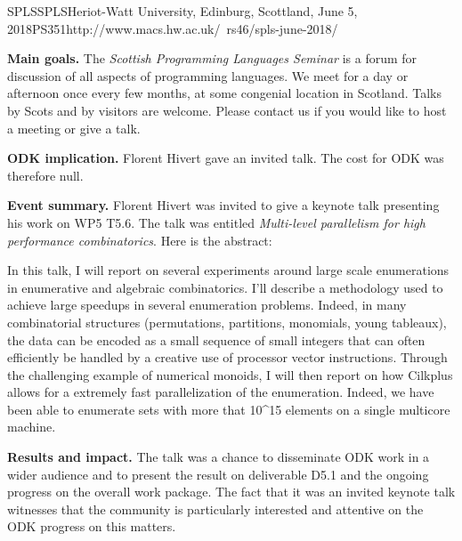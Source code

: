 \begin{event}{SPLS}{SPLS}{Heriot-Watt University, Edinburg, Scottland, June 5, 2018}{PS}{35}{1}{http://www.macs.hw.ac.uk/~rs46/spls-june-2018/}

\textbf{Main goals.}  The \emph{Scottish Programming Languages Seminar} is a
forum for discussion of all aspects of programming languages. We meet for a
day or afternoon once every few months, at some congenial location in
Scotland. Talks by Scots and by visitors are welcome. Please contact us if
you would like to host a meeting or give a talk.

\textbf{ODK implication.} Florent Hivert gave an invited talk. The cost for
ODK was therefore null.

\textbf{Event summary.}  Florent Hivert was invited to give a keynote talk
presenting his work on WP5 T5.6. The talk was entitled \emph{ Multi-level
  parallelism for high performance combinatorics}. Here is the abstract:

In this talk, I will report on several experiments around large scale
enumerations in enumerative and algebraic combinatorics.  I'll describe a
methodology used to achieve large speedups in several enumeration
problems. Indeed, in many combinatorial structures (permutations, partitions,
monomials, young tableaux), the data can be encoded as a small sequence of
small integers that can often efficiently be handled by a creative use of
processor vector instructions. Through the challenging example of numerical
monoids, I will then report on how Cilkplus allows for a extremely fast
parallelization of the enumeration. Indeed, we have been able to enumerate
sets with more that 10^15 elements on a single multicore machine.

\textbf{Results and impact.} The talk was a chance to disseminate ODK work in
a wider audience and to present the result on deliverable D5.1 and the ongoing
progress on the overall work package. The fact that it was an invited keynote
talk witnesses that the community is particularly interested and attentive on
the ODK progress on this matters.

\end{event}
